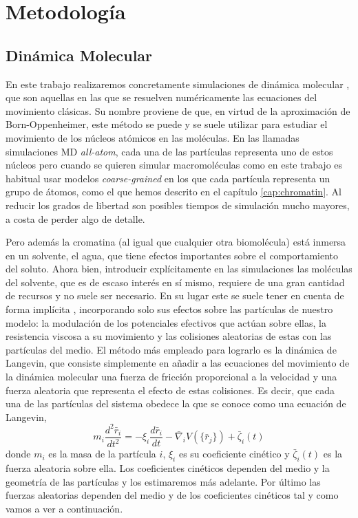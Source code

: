 \chapter{Metodología}
\label{cap:methodology}

\section{Dinámica Molecular}

En este trabajo realizaremos concretamente simulaciones de dinámica molecular \cite{Rapaport2004}, que son aquellas en las que se resuelven numéricamente las ecuaciones del movimiento clásicas. Su nombre proviene de que, en virtud de la aproximación de Born-Oppenheimer, este método se puede y se suele utilizar para estudiar el movimiento de los núcleos atómicos en las moléculas. En las llamadas simulaciones MD \textit{all-atom}, cada una de las partículas representa uno de estos núcleos pero cuando se quieren simular macromoléculas como en este trabajo es habitual usar modelos \textit{coarse-grained} en los que cada partícula representa un grupo de átomos, como el que hemos descrito en el capítulo \ref{cap:chromatin}. Al reducir los grados de libertad son posibles tiempos de simulación mucho mayores, a costa de perder algo de detalle.

Pero además la cromatina (al igual que cualquier otra biomolécula) está inmersa en un solvente, el agua, que tiene efectos importantes sobre el comportamiento del soluto. Ahora bien, introducir explícitamente en las simulaciones las moléculas del solvente, que es de escaso interés en sí mismo, requiere de una gran cantidad de recursos y no suele ser necesario. En su lugar este se suele tener en cuenta de forma implícita \cite{Leach2001}, incorporando solo sus efectos sobre las partículas de nuestro modelo: la modulación de los potenciales efectivos que actúan sobre ellas, la resistencia viscosa a su movimiento y las colisiones aleatorias de estas con las partículas del medio. El método más empleado para lograrlo es la dinámica de Langevin, que consiste simplemente en añadir a las ecuaciones del movimiento de la dinámica molecular una fuerza de fricción proporcional a la velocidad y una fuerza aleatoria que representa el efecto de estas colisiones. Es decir, que cada una de las partículas del sistema obedece la que se conoce como una ecuación de Langevin,
\begin{equation}
    \label{eq:Langevin}
    m_i\frac{d^2\bar{r}_i}{dt^2}=-\xi_i\frac{d\bar{r}_i}{dt}-\bar{\nabla}_iV\left(\{\bar{r}_j\}\right)+\bar{\zeta}_i(t)
\end{equation}
donde $m_i$ es la masa de la partícula $i$, $\xi_i$ es su coeficiente cinético y $\bar{\zeta}_i(t)$ es la fuerza aleatoria sobre ella. Los coeficientes cinéticos dependen del medio y la geometría de las partículas y los estimaremos más adelante. Por último las fuerzas aleatorias dependen del medio y de los coeficientes cinéticos tal y como vamos a ver a continuación.


